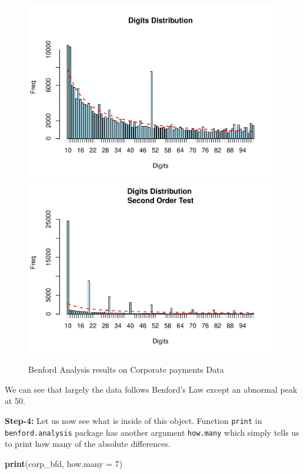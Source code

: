\documentclass[
]{book}
\newenvironment{Shaded}{\begin{snugshade}}{\end{snugshade}}
\newcommand{\AttributeTok}[1]{\textcolor[rgb]{0.13,0.29,0.53}{#1}}
\newcommand{\DecValTok}[1]{\textcolor[rgb]{0.00,0.00,0.81}{#1}}
\newcommand{\FunctionTok}[1]{\textcolor[rgb]{0.13,0.29,0.53}{\textbf{#1}}}
\newcommand{\NormalTok}[1]{#1}
\begin{document}
\begin{figure}

{\centering \includegraphics[width=0.47\linewidth,height=0.3\textheight]{DauR_files/figure-latex/corpben-1} \includegraphics[width=0.47\linewidth,height=0.3\textheight]{DauR_files/figure-latex/corpben-2} 

}

\caption{Benford Analysis results on Corporate payments Data}\label{fig:corpben}
\end{figure}

We can see that largely the data follows Benford's Law except an abnormal peak at 50.

\textbf{Step-4:} Let us now see what is inside of this object. Function \texttt{print} in \texttt{benford.analysis} package has another argument \texttt{how.many} which simply tells us to print how many of the absolute differences.

\begin{Shaded}
\begin{Highlighting}[]
\FunctionTok{print}\NormalTok{(corp\_bfd, }\AttributeTok{how.many =} \DecValTok{7}\NormalTok{)}
\end{Highlighting}
\end{Shaded}
\end{document}
